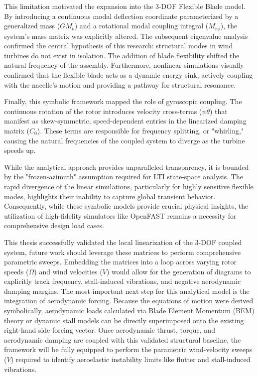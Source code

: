 \documentclass[final,onecolumn]{IEEEtran}
\begin{document}
This limitation motivated the expansion into the 3-DOF Flexible Blade model. By introducing a continuous modal deflection coordinate parameterized by a generalized mass ($GM_b$) and a rotational modal coupling integral ($M_{r\phi}$), the system's mass matrix was explicitly altered. The subsequent eigenvalue analysis confirmed the central hypothesis of this research: structural modes in wind turbines do not exist in isolation. The addition of blade flexibility shifted the natural frequency of the assembly. Furthermore, nonlinear simulations visually confirmed that the flexible blade acts as a dynamic energy sink, actively coupling with the nacelle's motion and providing a pathway for structural resonance.

Finally, this symbolic framework mapped the role of gyroscopic coupling. The continuous rotation of the rotor introduces velocity cross-terms ($\dot{\psi}\dot{\theta}$) that manifest as skew-symmetric, speed-dependent entries in the linearized damping matrix ($C_0$). These terms are responsible for frequency splitting, or "whirling," causing the natural frequencies of the coupled system to diverge as the turbine speeds up.

While the analytical approach provides unparalleled transparency, it is bounded by the "frozen-azimuth" assumption required for LTI state-space analysis. The rapid divergence of the linear simulations, particularly for highly sensitive flexible modes, highlights their inability to capture global transient behavior. Consequently, while these symbolic models provide crucial physical insights, the utilization of high-fidelity simulators like OpenFAST remains a necessity for comprehensive design load cases.

This thesis successfully validated the local linearization of the 3-DOF coupled system, future work should leverage these matrices to perform comprehensive parametric sweeps. Embedding the matrices into a loop across varying rotor speeds ($\Omega$) and wind velocities ($V$) would allow for the generation of diagrams to explicitly track frequency, stall-induced vibrations, and negative aerodynamic damping margins. The most important next step for this analytical model is the integration of aerodynamic forcing. Because the equations of motion were derived symbolically, aerodynamic loads calculated via Blade Element Momentum (BEM) theory or dynamic stall models can be directly superimposed onto the existing right-hand side forcing vector. Once aerodynamic thrust, torque, and aerodynamic damping are coupled with this validated structural baseline, the framework will be fully equipped to perform the parametric wind-velocity sweeps ($V$) required to identify aeroelastic instability limits like flutter and stall-induced vibrations.
\end{document}
